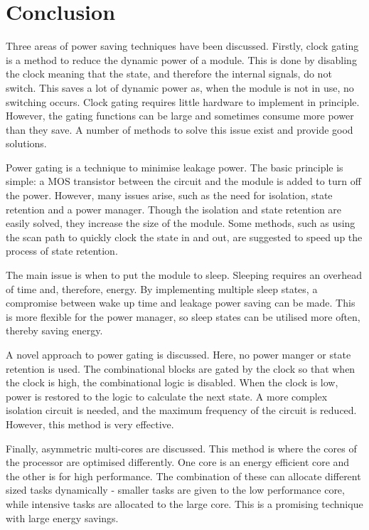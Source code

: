 
\section{Conclusion}

Three areas of power saving techniques have been discussed. 
Firstly, clock gating is a method to reduce the dynamic power of a module. 
This is done by disabling the clock meaning that the state, and therefore the internal signals, do not switch. 
This saves a lot of dynamic power as, when the module is not in use, no switching occurs. 
Clock gating requires little hardware to implement in principle. 
However, the gating functions can be large and sometimes consume more power than they save. 
A number of methods to solve this issue exist and provide good solutions.


Power gating is a technique to minimise leakage power.
The basic principle is simple: a MOS transistor between the circuit and the module is added to turn off the power.
However, many issues arise, such as the need for isolation, state retention and a power manager.
Though the isolation and state retention are easily solved, they increase the size of the module. 
Some methods, such as using the scan path to quickly clock the state in and out, are suggested to speed up the process of state retention. 

The main issue is when to put the module to sleep.
Sleeping requires an overhead of time and, therefore, energy. 
By implementing multiple sleep states, a compromise between wake up time and leakage power saving can be made. 
This is more flexible for the power manager, so sleep states can be utilised more often, thereby saving energy.

A novel approach to power gating is discussed. 
Here, no power manger or state retention is used. 
The combinational blocks are gated by the clock so that when the clock is high, the combinational logic is disabled. 
When the clock is low, power is restored to the logic to calculate the next state. 
A more complex isolation circuit is needed, and the maximum frequency of the circuit is reduced. 
However, this method is very effective.

Finally, asymmetric multi-cores are discussed.
This method is where the cores of the processor are optimised differently.
One core is an energy efficient core and the other is for high performance. 
The combination of these can allocate different sized tasks dynamically - smaller tasks are given to the low performance core, while intensive tasks are allocated to the large core.
This is a promising technique with large energy savings.

